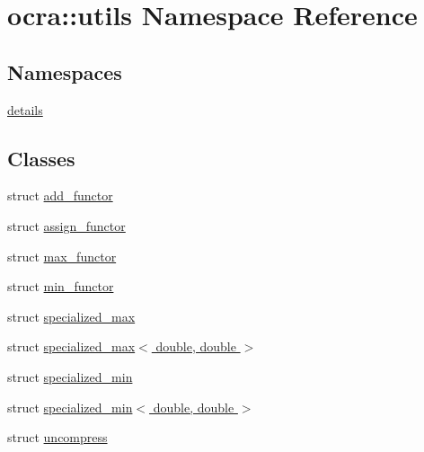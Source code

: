 \hypertarget{namespaceocra_1_1utils}{}\section{ocra\+:\+:utils Namespace Reference}
\label{namespaceocra_1_1utils}
\subsection*{Namespaces}
\begin{DoxyCompactItemize}
\item 
 \hyperlink{namespaceocra_1_1utils_1_1details}{details}
\end{DoxyCompactItemize}
\subsection*{Classes}
\begin{DoxyCompactItemize}
\item 
struct \hyperlink{structocra_1_1utils_1_1add__functor}{add\+\_\+functor}
\item 
struct \hyperlink{structocra_1_1utils_1_1assign__functor}{assign\+\_\+functor}
\item 
struct \hyperlink{structocra_1_1utils_1_1max__functor}{max\+\_\+functor}
\item 
struct \hyperlink{structocra_1_1utils_1_1min__functor}{min\+\_\+functor}
\item 
struct \hyperlink{structocra_1_1utils_1_1specialized__max}{specialized\+\_\+max}
\item 
struct \hyperlink{structocra_1_1utils_1_1specialized__max_3_01double_00_01double_01_4}{specialized\+\_\+max$<$ double, double $>$}
\item 
struct \hyperlink{structocra_1_1utils_1_1specialized__min}{specialized\+\_\+min}
\item 
struct \hyperlink{structocra_1_1utils_1_1specialized__min_3_01double_00_01double_01_4}{specialized\+\_\+min$<$ double, double $>$}
\item 
struct \hyperlink{structocra_1_1utils_1_1uncompress}{uncompress}
\end{DoxyCompactItemize}
